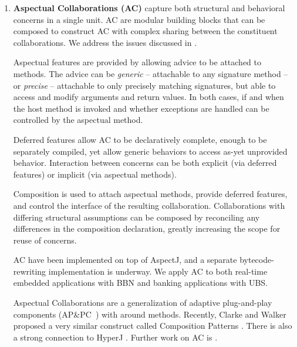 \documentclass{acm_proc_article-sp}
\begin{document}
\begin{enumerate}
\item
{\bf Aspectual Collaborations (AC)} capture both structural and behavioral concerns in a single unit.
AC are modular building blocks that can be composed to construct AC with 
complex sharing between the constituent collaborations.
We address the issues discussed in \cite{OssherTarr:2001}.

Aspectual features are provided by allowing advice to be attached to methods.
The advice can be {\em generic} -- attachable to any signature method -- 
or {\em precise} -- attachable
to only precisely matching signatures, 
but able to access and modify arguments and return values.
In both cases, if and when the host method is invoked 
and whether exceptions are handled can be controlled by the aspectual method.

Deferred features allow AC to be declaratively 
complete, enough to be separately compiled, yet allow generic behaviors 
to access as-yet unprovided behavior.
Interaction between concerns can be both 
explicit (via deferred features) or implicit (via aspectual methods).

Composition is used to attach aspectual methods, 
provide deferred features, and control the interface of
the resulting collaboration.
Collaborations with differing structural assumptions 
can be composed by reconciling any differences 
in the composition declaration, greatly increasing 
the scope for reuse of concerns.

AC have been implemented on top of AspectJ, 
and a separate bytecode-rewriting implementation is underway.
We apply AC to both real-time embedded applications with BBN and
banking applications with UBS.

Aspectual Collaborations \cite{aspectual:LLM} 
are a generalization of adaptive plug-and-play components
(AP\&PC~\cite{mezini:oopsla98}) with around methods. 
Recently, Clarke and Walker proposed a very similar
construct called Composition Patterns \cite{clarke-walker:cp2001,composition-patterns-impl}. 
There is also a strong connection to HyperJ \cite{tarr:n-degrees}.
Further work on AC is \cite{aspectual-collabs}.





\end{enumerate}
\end{document}
